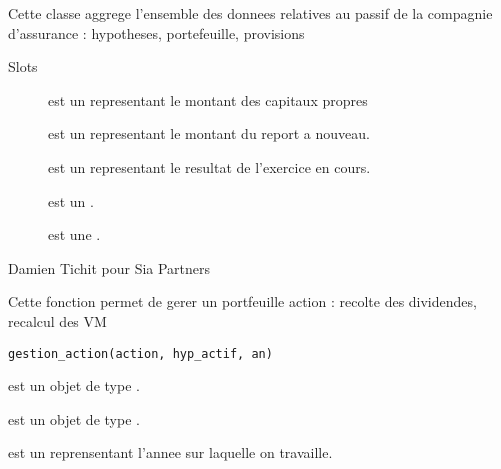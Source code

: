 \documentclass[a4paper]{book}
\begin{document}
%
\begin{Description}\relax
Cette classe aggrege l'ensemble des donnees relatives au passif de la compagnie d'assurance : hypotheses, portefeuille, provisions
\end{Description}
%
\begin{Section}{Slots}

\begin{description}

\item[] est un  representant le montant des capitaux propres

\item[] est un  representant le montant du report a nouveau.

\item[] est un  representant le resultat de l'exercice en cours.

\item[] est un .

\item[] est une .

\end{description}
\end{Section}
%
\begin{Author}\relax
Damien Tichit pour Sia Partners
\end{Author}
%
\begin{Description}\relax
Cette fonction permet de gerer un portfeuille action : recolte des dividendes, recalcul des VM
\end{Description}
%
\begin{Usage}
\begin{verbatim}
gestion_action(action, hyp_actif, an)
\end{verbatim}
\end{Usage}
%
\begin{Arguments}
\begin{ldescription}
\item[\code{action}] est un objet de type .

\item[\code{hyp\_actif}] est un objet de type .

\item[\code{an}] est un  reprensentant l'annee sur laquelle on travaille.
\end{ldescription}
\end{Arguments}
\end{document}
